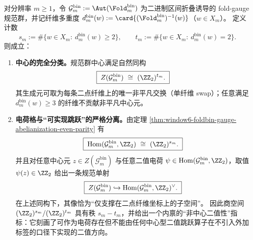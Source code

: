 \begin{proposition}[二点纤维的中心型跳跃与非中心二值性的秩缺口]\label{prop:window6-foldbin-gauge-center-vs-charge-separation}
对分辨率 \(m\ge 1\)，令
\(
\mathcal{G}^{\mathrm{bin}}_m:=\Aut(\Fold^{\mathrm{bin}}_m)
\)
为二进制区间折叠诱导的 fold-gauge 规范群，并记纤维多重度
\(
d^{\mathrm{bin}}_m(w):=\card{(\Fold^{\mathrm{bin}}_m)^{-1}(w)}
\)（\(w\in X_m\)）。
定义计数
\[
s_m:=\#\{w\in X_m:\ d^{\mathrm{bin}}_m(w)\ge 2\},
\qquad
t_m:=\#\{w\in X_m:\ d^{\mathrm{bin}}_m(w)=2\}.
\]
则成立：
\begin{enumerate}
\normalfont
  \item \textbf{中心的完全分类。}规范群中心满足自然同构
  \[
  \boxed{\;Z(\mathcal{G}^{\mathrm{bin}}_m)\ \cong\ (\ZZ_2)^{t_m}.\;}
  \]
  其生成元可取为每条二点纤维上的唯一非平凡交换（单纤维 swap）；任意满足 \(d^{\mathrm{bin}}_m(w)\ge 3\) 的纤维不贡献非平凡中心元。
  \item \textbf{电荷格与“可实现跳跃”的严格分离。}由定理 \ref{thm:window6-foldbin-gauge-abelianization-even-parity} 有
  \[
  \boxed{\;\mathrm{Hom}(\mathcal{G}^{\mathrm{bin}}_m,\ZZ_2)\ \cong\ (\ZZ_2)^{s_m}.\;}
  \]
  并且对任意中心元 \(z\in Z(\mathcal{G}^{\mathrm{bin}}_m)\) 与任意二值电荷 \(\psi\in\mathrm{Hom}(\mathcal{G}^{\mathrm{bin}}_m,\ZZ_2)\)，取值 \(\psi(z)\in\ZZ_2\) 给出一条规范单射
  \[
  \boxed{\;Z(\mathcal{G}^{\mathrm{bin}}_m)\hookrightarrow \mathrm{Hom}(\mathcal{G}^{\mathrm{bin}}_m,\ZZ_2)^\vee.\;}
  \]
  在上述同构下，其像恰为“仅支撑在二点纤维坐标上的子空间”。
  因此商空间 \((\ZZ_2)^{s_m}/(\ZZ_2)^{t_m}\) 具有秩 \(s_m-t_m\)，并给出一个内禀的“非中心二值性”指标：它刻画了可作为电荷存在但不能由任何中心型二值跳跃算子在不引入外加标签的口径下实现的二值方向。
\end{enumerate}
\end{proposition}
